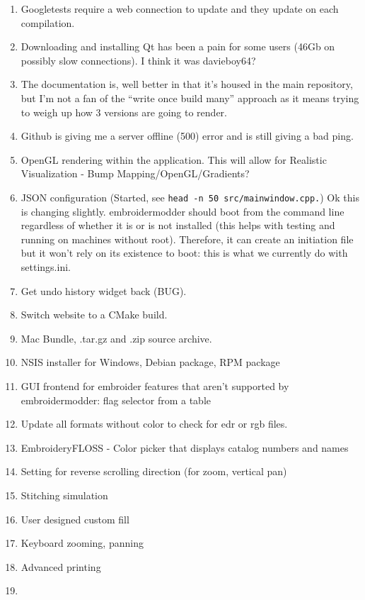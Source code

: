 \documentclass[a4paper, 11pt]{report}
\begin{document}
\begin{enumerate}
\def\labelenumi{\arabic{enumi}.}
\item
  Googletests require a web connection to update and they update on each
  compilation.
\item
  Downloading and installing Qt has been a pain for some users (46Gb on
  possibly slow connections). I think it was davieboy64?
\item
  The documentation is, well better in that it's housed in the main
  repository, but I'm not a fan of the ``write once build many''
  approach as it means trying to weigh up how 3 versions are going to
  render.
\item
  Github is giving me a server offline (500) error and is still giving a
  bad ping.
\item
  OpenGL rendering within the application. This will allow for Realistic
  Visualization - Bump Mapping/OpenGL/Gradients?
\item
  JSON configuration (Started, see
  \texttt{head\ -n\ 50\ src/mainwindow.cpp.}) Ok this is changing
  slightly. embroidermodder should boot from the command line regardless
  of whether it is or is not installed (this helps with testing and
  running on machines without root). Therefore, it can create an
  initiation file but it won't rely on its existence to boot: this is
  what we currently do with settings.ini.
\item
  Get undo history widget back (BUG).
\item
  Switch website to a CMake build.
\item
  Mac Bundle, .tar.gz and .zip source archive.
\item
  NSIS installer for Windows, Debian package, RPM package
\item
  GUI frontend for embroider features that aren't supported by
  embroidermodder: flag selector from a table
\item
  Update all formats without color to check for edr or rgb files.
\item
  EmbroideryFLOSS - Color picker that displays catalog numbers and names
\item
  Setting for reverse scrolling direction (for zoom, vertical pan)
\item
  Stitching simulation
\item
  User designed custom fill
\item
  Keyboard zooming, panning
\item
  Advanced printing
\item

\end{enumerate}
\end{document}
